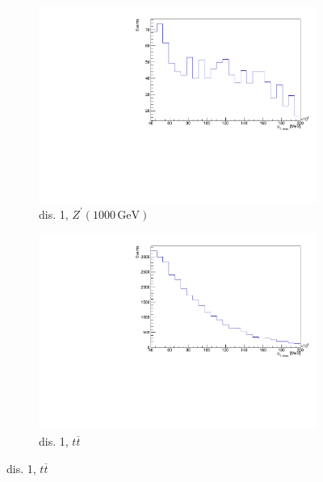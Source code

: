 \begin{figure}[H]%
  \begin{subfigure}{0.48\textwidth}%
    \centering%
    \includegraphics[width=\textwidth]{plots/discriminant/zprime1000.el_met_et.pdf}%
    \caption{dis. 1, $Z^\prime(1000 \, \si{\giga\eV})$}%
    \label{fig:5a}%
  \end{subfigure}%
  \hfill
  \begin{subfigure}{0.48\textwidth}%
    \centering%
    \includegraphics[width=\textwidth]{plots/discriminant/ttbar.el_met_et.pdf}%
    \caption{dis. 1, $t \overline{t}$}%
    \label{fig:5b}%
  \end{subfigure}%


\end{figure}
